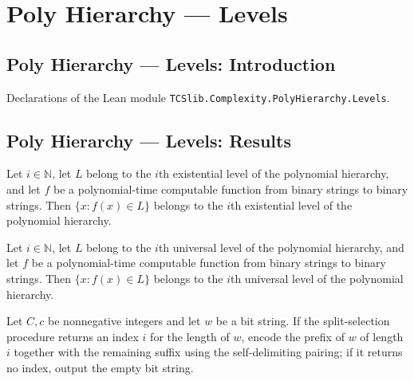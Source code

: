 \section{Poly Hierarchy --- Levels}
\subsection*{Poly Hierarchy --- Levels: Introduction}

Declarations of the Lean module \texttt{TCSlib.Complexity.PolyHierarchy.Levels}.

\subsection*{Poly Hierarchy --- Levels: Results}

\begin{theorem}
\label{Complexity.preimage_mem_SigmaP}
\leanok
{}
Let $i\in\mathbb{N}$, let $L$ belong to the $i$th existential level of the polynomial
hierarchy, and let $f$ be a polynomial-time computable function from binary strings to
binary strings. Then $\{x:f(x)\in L\}$ belongs to the $i$th existential level of the
polynomial hierarchy.
\end{theorem}

\begin{theorem}
\label{Complexity.preimage_mem_PiP}
\leanok
{}
Let $i\in\mathbb{N}$, let $L$ belong to the $i$th universal level of the polynomial
hierarchy, and let $f$ be a polynomial-time computable function from binary strings to
binary strings. Then $\{x:f(x)\in L\}$ belongs to the $i$th universal level of the
polynomial hierarchy.
\end{theorem}

\begin{definition}
\label{Complexity.certSplit}
\leanok
{}
Let $C,c$ be nonnegative integers and let $w$ be a bit string. If the split-selection
procedure returns an index $i$ for the length of $w$, encode the prefix of $w$ of length
$i$ together with the remaining suffix using the self-delimiting pairing; if it returns
no index, output the empty bit string.
\end{definition}

